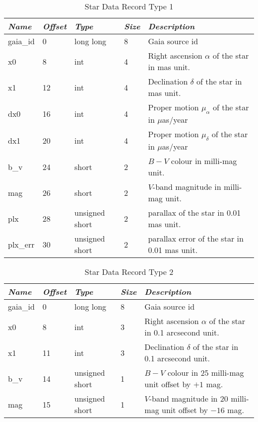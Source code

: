 \begin{table}[htbp]
\begin{tabularx}{\textwidth}{llllX}\toprule
\emph{Name} & \emph{Offset}& \emph{Type} & \emph{Size} &\emph{Description}\\\midrule
gaia\_id       &  0 & long long          & 8 & Gaia source id\\%
x0             &  8 & int                & 4 & Right ascension $\alpha$ of the star in mas unit.\\%
x1             & 12 & int                & 4 & Declination $\delta$ of the star in mas unit.\\%
dx0            & 16 & int                & 4 & Proper motion $\mu_{\alpha}$ of the star in $\mu$as/year\\%
dx1            & 20 & int                & 4 & Proper motion $\mu_{\delta}$ of the star in $\mu$as/year\\%
b\_v           & 24 & short              & 2 & $B-V$ colour in milli-mag unit.\\
mag            & 26 & short              & 2 & $V$-band magnitude in milli-mag unit.\\
plx            & 28 & unsigned short     & 2 & parallax of the star in 0.01 mas unit.\\
plx\_err       & 30 & unsigned short     & 2 & parallax error of the star in 0.01 mas unit.\\\bottomrule
\end{tabularx}
\caption{Star Data Record Type 1}
\label{tab:StarDataRecord1}
\end{table}

\begin{table}[htbp]
\begin{tabularx}{\textwidth}{llllX}\toprule
\emph{Name} & \emph{Offset} & \emph{Type} & \emph{Size} & \emph{Description}\\\midrule
gaia\_id       &  0 & long long          & 8 & Gaia source id\\%
x0             &  8 & int                & 3 & Right ascension $\alpha$ of the star in 0.1 arcsecond unit.\\%
x1             & 11 & int                & 3 & Declination $\delta$ of the star in 0.1 arcsecond unit.\\%
b\_v           & 14 & unsigned short     & 1 & $B-V$ colour in 25 milli-mag unit offset by $+1$ mag.\\
mag            & 15 & unsigned short     & 1 & $V$-band magnitude in 20 milli-mag unit offset by $-16$ mag.\\\bottomrule
\end{tabularx}
\caption{Star Data Record Type 2}
\label{tab:StarDataRecord2}
\end{table}
\clearpage

